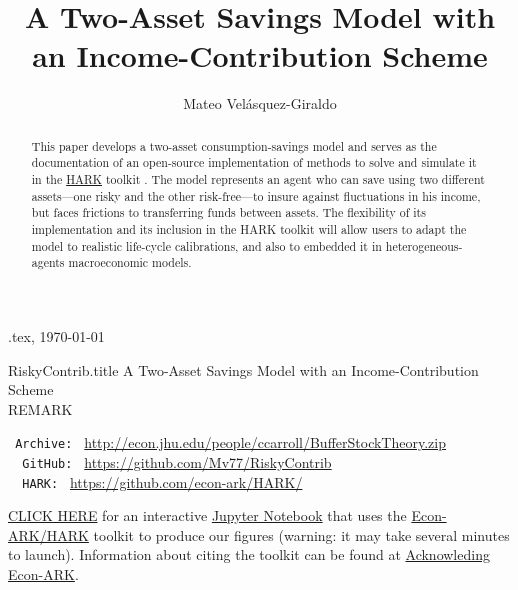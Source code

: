 \documentclass[./RiskyContrib.tex]{subfiles}
\begin{document}
\hfill{\tiny \texname.tex, \today}

\begin{verbatimwrite}{RiskyContrib.title}  %
A Two-Asset Savings Model with an Income-Contribution Scheme\\
REMARK
\end{verbatimwrite}

\title{A Two-Asset Savings Model with an Income-Contribution Scheme}

\author{Mateo Vel\'asquez-Giraldo}


\maketitle 

\hypertarget{abstract}{}
\begin{abstract}
This paper develops a two-asset consumption-savings model and serves as
the documentation of an open-source implementation of methods to solve and
simulate it in the \href{https://econ-ark.org/toolkit}{HARK}
toolkit \citep{carroll2018HARK}. The model represents an agent who can
save using two different assets---one risky and the other risk-free---to insure
against fluctuations in his income, but faces frictions to transferring funds between
assets. The flexibility of its implementation and its inclusion in the HARK
toolkit will allow users to adapt the model to realistic life-cycle calibrations, and
also to embedded it in heterogeneous-agents macroeconomic models.
\end{abstract}

\hypertarget{links}{}
\begin{small}
\parbox{\textwidth}{
\begin{center}
\begin{tabbing}
\texttt{~Archive:~} \= \= \url{http://econ.jhu.edu/people/ccarroll/BufferStockTheory.zip} \kill \\  %
\texttt{~~GitHub:~} \> \> \url{https://github.com/Mv77/RiskyContrib} \\
\texttt{~~HARK:~} \> \> \url{https://github.com/econ-ark/HARK/} \\
\end{tabbing}
\end{center}
          
\href{https://mybinder.org/v2/gh/Mv77/RiskyContrib/main?filepath=Code\%2FPython\%2FRiskyContrib.ipynb}{CLICK HERE} for an interactive \href{https://en.wikipedia.org/wiki/Project\_Jupyter\#Jupyter_Notebook}{Jupyter Notebook} that uses the \href{https://econ-ark/HARK}{Econ-ARK/HARK} toolkit to produce our figures (warning: it may take several minutes to launch).  Information about citing the toolkit can be found at \href{https://econ-ark.org/acknowledging/}{Acknowleding Econ-ARK}.
} %
\end{small}
\end{document}
